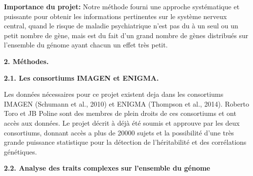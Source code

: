 \documentclass[12pt]{article}
\begin{document}
\noindent
\textbf{Importance du projet:} Notre m\'ethode fourni une approche syst\'ematique et puissante pour obtenir les informations pertinentes sur le syst\`eme nerveux central, quand le risque de maladie psychiatrique n'est pas du \`a un seul ou un petit nombre de g\`ene, mais est du fait d'un grand nombre de g\`enes distribu\'es sur l'ensemble du g\'enome ayant chacun un effet tr\`es petit. 
\medskip

\noindent
{\large \textbf{2. M\'ethodes.}}
\smallskip

\noindent
\textbf{2.1. Les consortiums IMAGEN et ENIGMA.}
\smallskip

\noindent
Les donn\'ees n\'ecessaires pour ce projet existent deja dans les consortiums IMAGEN (Schumann et al., 2010) et ENIGMA (Thompson et al., 2014). Roberto Toro et JB Poline sont des membres de plein droits de ces consortiums et ont acc\`es aux donn\'ees. Le projet d\'ecrit \`a d\'ej\`a \'et\'e soumis et approuve par les deux consortiums, donnant acc\`es a plus de 20000 sujets et la possibilit\'e d'une tr\`es grande puissance statistique pour la d\'etection de l'h\'eritabilit\'e et des corr\'elations g\'en\'etiques. 
\smallskip

\noindent
\textbf{2.2. Analyse des traits complexes sur l'ensemble du g\'enome}
\smallskip
\end{document}
